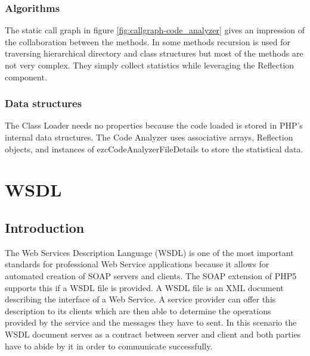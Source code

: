 \documentclass[10pt,final,a4paper,oneside]{article}
\begin{document}
%
%
%
%
%
%
%
%
% 
% 
% 
% 



\subsubsection{Algorithms}

The static call graph in figure \ref{fig:callgraph-code_analyzer}
gives an impression of the collaboration between the methods.
In some methods recursion is used for traversing hierarchical 
directory and class structures but most of the methods
are not very complex. They simply collect statistics while
leveraging the Reflection component.

\subsubsection{Data structures}
The Class Loader needs no properties
because the code loaded is stored
in PHP's internal data structures.
The Code Analyzer uses associative arrays, Reflection objects, 
and instances of ezcCodeAnalyzerFileDetails
to store the statistical data.




\section{WSDL}\label{sec:WSDL}
\subsection{Introduction}
The Web Services Description Language (WSDL) \cite{WSDL}
is one of the most important standards
for professional Web Service applications
because it allows for automated creation
of SOAP servers and clients.
The SOAP extension of PHP5 supports this
if a WSDL file is provided.
A WSDL file is an XML document
describing the interface of a Web Service.
A service provider can offer this description
to its clients which are then able
to determine the operations provided by the service
and the messages they have to sent.
In this scenario the WSDL document
serves as a contract between server and client
and both parties have to abide by it
in order to communicate successfully.
\end{document}
